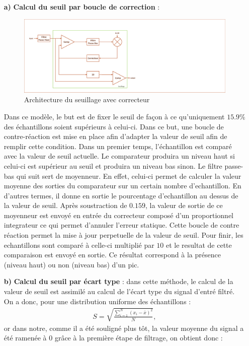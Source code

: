 \documentclass[a4paper,12pt]{article}
\begin{document}
\begin{itemize}
\begin{itemize}
\item[\textbf{a)}] \textbf{Calcul du seuil par boucle de correction} :
\begin{figure}[H]
\centering
\includegraphics[width=\textwidth, keepaspectratio]{chainCedric.pdf}
\caption{Architecture du seuillage avec correcteur}
\end{figure}
Dans ce modèle, le but est de fixer le seuil de façon à ce qu'uniquement $15.9\%$ des échantillons soient supérieurs à celui-ci.
Dans ce but, une boucle de contre-réaction est mise en place afin d'adapter la valeur de seuil afin de remplir cette condition.
Dans un premier temps, l'échantillon est comparé avec la valeur de seuil actuelle. Le comparateur produira un niveau haut si celui-ci est supérieur au seuil et produira un niveau bas sinon. Le filtre passe-bas qui suit sert de moyenneur.
En effet, celui-ci permet de calculer la valeur moyenne des sorties du comparateur sur un certain nombre d'echantillon.
En d'autres termes, il donne en sortie le pourcentage d'echantillon au dessus de la valeur de seuil. Après soustraction de $0.159$, la valeur de sortie de ce moyenneur est envoyé en entrée du correcteur composé d'un proportionnel integrateur ce qui permet d'annuler l'erreur statique.
Cette boucle de contre réaction permet la mise à jour perpetuelle de la valeur de seuil. Pour finir, les echantillons sont comparé à celle-ci multiplié par $10$ et le resultat de cette comparaison est envoyé en sortie. Ce résultat correspond à la présence (niveau haut) ou non (niveau bas) d'un pic.
\item[\textbf{b)}] \textbf{Calcul du seuil par écart type} : dans cette méthode, le calcul de la valeur de seuil est assimilé au calcul de l'écart type du signal d'entré filtré. On a donc, pour une distribution uniforme des échantillons :
\begin{eqnarray*}
S = \sqrt{\frac{\sum^N_{i=1}\left(x_i-\overline{x}\right)^2}{N}},
\end{eqnarray*}
or dans notre, comme il a été souligné plus tôt, la valeur moyenne du signal a été ramenée à 0 grâce à la première étape de filtrage, on obtient donc :

\end{itemize}
\end{itemize}
\end{document}
